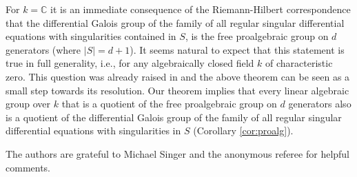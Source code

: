 \documentclass[a4paper, 11pt]{article}
\begin{document}
%
%
%

  

For $k=\mathbb{C}$ it is an immediate consequence of the Riemann-Hilbert correspondence that the differential Galois group of the family of all regular singular differential equations with singularities contained in $S$, is the free proalgebraic group on $d$ generators (where $|S|=d+1$). It seems natural to expect that this statement is true in full generality, i.e., for any algebraically closed field $k$ of characteristic zero. This question was already raised in \cite{Wibmer:RegSing} and the above theorem can be seen as a small step towards its resolution. Our theorem implies that every linear algebraic group over $k$ that is a quotient of the free proalgebraic group on $d$ generators also is a quotient of the differential Galois group of the family of all regular singular differential equations with singularities in $S$ (Corollary \ref{cor:proalg}).

\medskip

The authors are grateful to Michael Singer and the anonymous referee for helpful comments.

\end{document}
